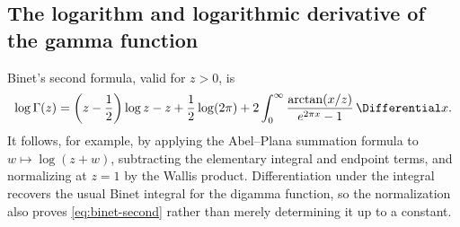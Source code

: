 \documentclass[11pt,a4paper,oneside,openany]{book}
\theoremstyle{definition}
\theoremstyle{remark}
\begin{document}
\subsection{The logarithm and logarithmic derivative of the gamma function}
Binet's second formula, valid for $z>0$, is
\begin{equation}
\label{eq:binet-second}
 \log\Gamma(z)
 =\left(z-\frac12\right)\log z-z+\frac12\log(2\pi)
 +2\int_0^\infty\frac{\arctan(x/z)}{e^{2\pi x}-1}\,\Differential x.
\end{equation}
It follows, for example, by applying the Abel--Plana summation formula to
$w\mapsto\log(z+w)$, subtracting the elementary integral and endpoint terms, and
normalizing at $z=1$ by the Wallis product.  Differentiation under the integral
recovers the usual Binet integral for the digamma function, so the normalization
also proves \eqref{eq:binet-second} rather than merely determining it up to a
constant.
\end{document}
